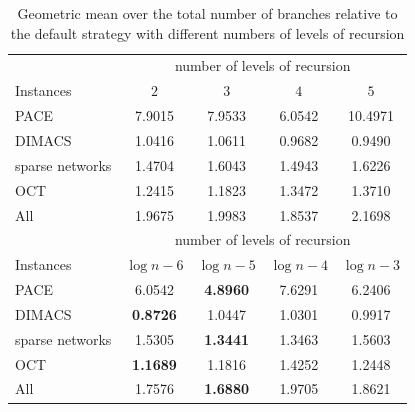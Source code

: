 \documentclass[12pt,a4paper,twoside]{scrartcl}
\numberwithin{equation}{section}
\begin{document}
\begin{table}[hbt!]
	\centering
	\begin{tabular}{l|cccc|}	  & \multicolumn{4}{c|}{number of levels of recursion} \\ \cline{2-5}
		Instances & $2$ & $3$ & $4$ & $5$ \\
		\hline
		PACE & 7.9015 & 7.9533 & 6.0542 & 10.4971 \\
		DIMACS & 1.0416 & 1.0611 & 0.9682 & 0.9490  \\
		sparse networks & 1.4704 & 1.6043 & 1.4943 & 1.6226  \\
		OCT & 1.2415 & 1.1823 & 1.3472 & 1.3710  \\
		All & 1.9675 & 1.9983 & 1.8537 & 2.1698 \\ \hline \hline
		& \multicolumn{4}{c|}{number of levels of recursion} \\ \cline{2-5}
		Instances & $\log n -6$ & $\log n -5$ & $\log n -4$ & $\log n -3$ \\
		\hline
		PACE & 6.0542 & \textbf{4.8960} & 7.6291 & 6.2406  \\
		DIMACS & \textbf{0.8726} & 1.0447 & 1.0301 & 0.9917  \\
		sparse networks & 1.5305 & \textbf{1.3441} & 1.3463 & 1.5603  \\
		OCT & \textbf{1.1689} & 1.1816 & 1.4252 & 1.2448  \\
		All & 1.7576 & \textbf{1.6880} & 1.9705 & 1.8621  \\ \hline
		
	\end{tabular}
	\caption{Geometric mean over the total number of branches relative to the default strategy with different numbers of levels of recursion}
	\label{tab:thresh2}
	
\end{table}
\end{document}
